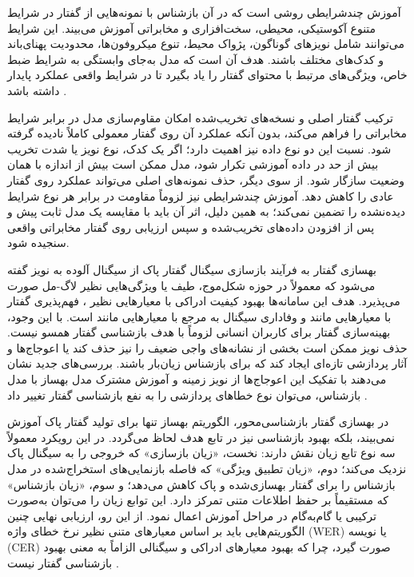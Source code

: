 

آموزش چندشرایطی روشی است که در آن بازشناس با نمونه‌هایی از گفتار در شرایط متنوع آکوستیکی، محیطی، سخت‌افزاری و مخابراتی آموزش می‌بیند. این شرایط می‌توانند شامل نویزهای گوناگون، پژواک محیط، تنوع میکروفون‌ها، محدودیت پهنای‌باند و کدک‌های مختلف باشند. هدف آن است که مدل به‌جای وابستگی به شرایط ضبط خاص، ویژگی‌های مرتبط با محتوای گفتار را یاد بگیرد تا در شرایط واقعی عملکرد پایدار داشته باشد  .

ترکیب گفتار اصلی و نسخه‌های تخریب‌شده امکان مقاوم‌سازی مدل در برابر شرایط مخابراتی را فراهم می‌کند، بدون آنکه عملکرد آن روی گفتار معمولی کاملاً نادیده گرفته شود. نسبت این دو نوع داده نیز اهمیت دارد؛ اگر یک کدک، نوع نویز یا شدت تخریب بیش از حد در داده آموزشی تکرار شود، مدل ممکن است بیش از اندازه با همان وضعیت سازگار شود. از سوی دیگر، حذف نمونه‌های اصلی می‌تواند عملکرد روی گفتار عادی را کاهش دهد. آموزش چندشرایطی نیز لزوماً مقاومت در برابر هر نوع شرایط دیده‌نشده را تضمین نمی‌کند؛ به همین دلیل، اثر آن باید با مقایسه یک مدل ثابت پیش و پس از افزودن داده‌های تخریب‌شده و سپس ارزیابی روی گفتار مخابراتی واقعی سنجیده شود.


بهسازی گفتار به فرآیند بازسازی سیگنال گفتار پاک از سیگنال آلوده به نویز گفته می‌شود که معمولاً در حوزه شکل‌موج، طیف یا ویژگی‌هایی نظیر لاگ-مل صورت می‌پذیرد. هدف این سامانه‌ها بهبود کیفیت ادراکی با معیارهایی نظیر ، فهم‌پذیری گفتار با معیارهایی مانند  و وفاداری سیگنال به مرجع با معیارهایی مانند  است. با این وجود، بهینه‌سازی گفتار برای کاربران انسانی لزوماً با هدف بازشناسی گفتار همسو نیست. حذف نویز ممکن است بخشی از نشانه‌های واجی ضعیف را نیز حذف کند یا اعوجاج‌ها و آثار پردازشی تازه‌ای ایجاد کند که برای بازشناس زیان‌بار باشند. بررسی‌های جدید نشان می‌دهند با تفکیک این اعوجاج‌ها از نویز زمینه و آموزش مشترک مدل بهساز با مدل بازشناس، می‌توان نوع خطاهای پردازشی را به نفع بازشناسی گفتار تغییر داد .

در بهسازی گفتار بازشناسی‌محور، الگوریتم بهساز تنها برای تولید گفتار پاک آموزش نمی‌بیند، بلکه بهبود بازشناسی نیز در تابع هدف لحاظ می‌گردد. در این رویکرد معمولاً سه نوع تابع زیان نقش دارند: نخست، «زیان بازسازی» که خروجی را به سیگنال پاک نزدیک می‌کند؛ دوم، «زیان تطبیق ویژگی» که فاصله بازنمایی‌های استخراج‌شده در مدل بازشناس را برای گفتار بهسازی‌شده و پاک کاهش می‌دهد؛ و سوم، «زیان بازشناس» که مستقیماً بر حفظ اطلاعات متنی تمرکز دارد. این توابع زیان را می‌توان به‌صورت ترکیبی یا گام‌به‌گام در مراحل آموزش اعمال نمود. از این رو، ارزیابی نهایی چنین الگوریتم‌هایی باید بر اساس معیارهای متنی نظیر نرخ خطای واژه (WER) یا نویسه (CER) صورت گیرد، چرا که بهبود معیارهای ادراکی و سیگنالی الزاماً به معنی بهبود بازشناسی گفتار نیست .


